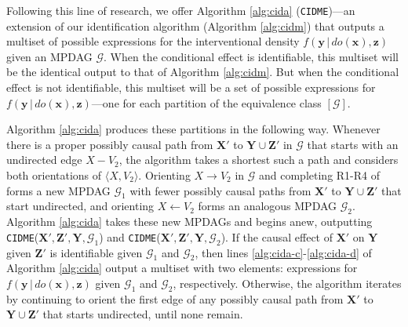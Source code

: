 \documentclass[11pt]{article}
\newcommand{\mb}[1]{\mathbf{#1}}
\newcommand{\g}[1][G]{\mathcal{#1}}
\begin{document}
Following this line of research, we offer Algorithm \ref{alg:cida} (\texttt{CIDME})---an extension of our identification algorithm (Algorithm \ref{alg:cidm}) that outputs a multiset of possible expressions for the interventional density $f(\mb{y} \,|\, do(\mb{x}), \mb{z})$ given an MPDAG $\g$. When the conditional effect is identifiable, this multiset will be the identical output to that of Algorithm \ref{alg:cidm}. But when the conditional effect is not identifiable, this multiset will be a set of  possible expressions for $f(\mb{y} \,|\, do(\mb{x}), \mb{z})$---one for each partition of the equivalence class $[\g]$. 

Algorithm \ref{alg:cida} produces these partitions in the following way. Whenever there is a proper possibly causal path from $\mb{X'}$ to $\mb{Y} \cup \mb{Z'}$ in $\g$ that starts with an undirected edge $X-V_2$, the algorithm takes a shortest such a path and considers both orientations of $\langle X, V_2 \rangle$. Orienting $X \to V_2$ in $\g$ and completing R1-R4 of \cite{meek1995causal} forms a new MPDAG $\g_1$ with fewer possibly causal paths from $\mb{X'}$ to $\mb{Y} \cup \mb{Z'}$ that start undirected, and orienting $X \gets V_2$ forms an analogous MPDAG $\g_2$. Algorithm \ref{alg:cida} takes these new MPDAGs and begins anew, outputting \texttt{CIDME}($\mb{X',Z',Y}, \g_1$) and \texttt{CIDME}($\mb{X',Z',Y}, \g_2$). If the causal effect of $\mb{X'}$ on $\mb{Y}$ given $\mb{Z'}$ is identifiable given $\g_1$ and $\g_2$, then lines \ref{alg:cida-c}-\ref{alg:cida-d} of Algorithm \ref{alg:cida} output a multiset with two elements: expressions for $f(\mb{y} \,|\, do(\mb{x}), \mb{z})$ given $\g_1$ and $\g_2$, respectively. Otherwise, the algorithm iterates by continuing to orient the first edge of any possibly causal path from $\mb{X'}$ to $\mb{Y} \cup \mb{Z'}$ that starts undirected, until none remain.
\end{document}
